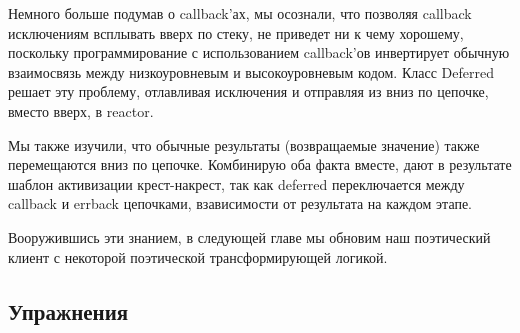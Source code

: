 Немного больше подумав о callback'ах, мы осознали, что 
позволяя callback исключениям всплывать вверх по стеку, 
не приведет ни к чему хорошему, поскольку программирование 
с использованием callback'ов инвертирует обычную взаимосвязь 
между низкоуровневым и высокоуровневым кодом. Класс Deferred 
решает эту проблему, отлавливая исключения и отправляя из вниз по 
цепочке, вместо вверх, в reactor.
 

Мы также изучили, что обычные результаты (возвращаемые значение) 
также перемещаются вниз по цепочке. Комбинирую оба факта вместе, дают 
в результате шаблон активизации крест-накрест, так как deferred 
переключается между callback и errback цепочками, взависимости от 
результата на каждом этапе.


Вооружившись эти знанием, в следующей главе мы 
обновим наш поэтический клиент с некоторой поэтической 
трансформирующей логикой.


\subsection{Упражнения}

